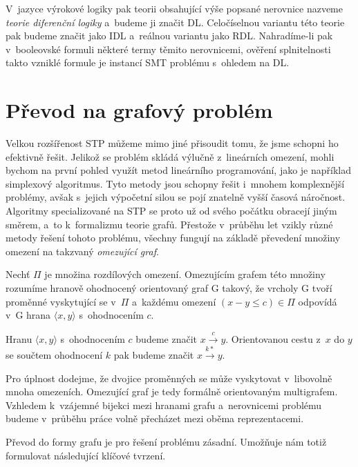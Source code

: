 V~jazyce výrokové logiky pak teorii obsahující výše popsané nerovnice nazveme \emph{teorie diferenční logiky} a~budeme ji značit DL. Celočíselnou variantu této teorie pak budeme značit jako IDL a~reálnou variantu jako RDL. Nahradíme-li pak v~booleovské formuli některé termy těmito nerovnicemi, ověření splnitelnosti takto vzniklé formule je instancí SMT problému s~ohledem na DL.



\section{Převod na grafový problém}\label{graf}

Velkou rozšířenost STP můžeme mimo jiné přisoudit tomu, že jsme schopni ho efektivně řešit. Jelikož se problém skládá výlučně z~lineárních omezení, mohli bychom na první pohled využít metod lineárního programování, jako je například simplexový algoritmus. Tyto metody jsou schopny řešit i~mnohem komplexnější problémy, avšak s~jejich výpočetní silou se pojí znatelně vyšší časová náročnost. Algoritmy specializované na STP se proto už od svého počátku \cite[Kapitola 2]{Dechter91} obracejí jiným směrem, a~to k~formalizmu teorie grafů. Přestože v~průběhu let vzikly různé metody řešení tohoto problému, všechny fungují na základě převedení množiny omezení na takzvaný \emph{omezující graf}.

\begin{definice}
	Nechť $\Pi$ je množina rozdílových omezení. Omezujícím grafem této množiny rozumíme hranově ohodnocený orientovaný graf G takový, že vrcholy G tvoří proměnné vyskytující se v~$\Pi$ a~každému omezení $(x-y \leq c) \in \Pi$ odpovídá v~G hrana $\langle x,y\rangle$ s~ohodnocením $c$.
\end{definice}
\begin{pozn}
	Hranu $\langle x,y\rangle$ s~ohodnocením $c$ budeme značit $x \xrightarrow{c} y$. Orientovanou cestu z~$x$ do $y$ se součtem ohodnocení $k$ pak budeme značit $x \xrightarrow{k*} y$.
\end{pozn}

Pro úplnost dodejme, že dvojice proměnných se může vyskytovat v~libovolně mnoha omezeních. Omezující graf je tedy formálně orientovaným multigrafem. Vzhledem k~vzájemné bijekci mezi hranami grafu a~nerovnicemi problému budeme v~průběhu práce volně přecházet mezi oběma reprezentacemi.

Převod do formy grafu je pro řešení problému zásadní. Umožňuje nám totiž formulovat následující klíčové tvrzení.

